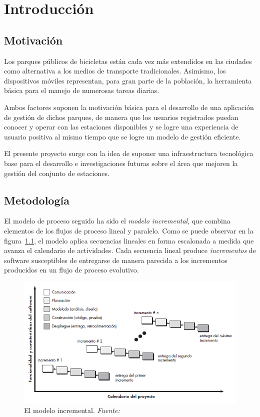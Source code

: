 \chapter{Introducción}

\section{Motivación}

Los parques públicos de bicicletas están cada vez más extendidos en las ciudades como alternativa a los medios de transporte tradicionales. Asimismo, los dispositivos móviles representan, para gran parte de la población, la herramienta básica para el manejo de numerosas tareas diarias.

Ambos factores suponen la motivación básica para el desarrollo de una aplicación de gestión de dichos parques, de manera que los usuarios registrados puedan conocer y operar con las estaciones disponibles y se logre una experiencia de usuario positiva al mismo tiempo que se logre un modelo de gestión eficiente.

El presente proyecto surge con la idea de suponer una infraestructura tecnológica base para el desarrollo e investigaciones futuras sobre el área que mejoren la gestión del conjunto de estaciones.

\section{Metodología}

El modelo de proceso seguido ha sido el \emph{modelo incremental}, que combina elementos de los flujos de proceso lineal y paralelo. Como se puede observar en la figura~\ref{fig:procesoIncremental}, el modelo aplica secuencias lineales en forma escalonada a medida que avanza el calendario de actividades. Cada secuencia lineal produce \emph{incrementos} de software susceptibles de entregarse de manera parecida a los incrementos producidos en un flujo de proceso evolutivo.

\begin{figure}
	\centering
	\includegraphics[width=\linewidth,height=\textheight,keepaspectratio]{Images/ModeloIncremental}
	\caption[El modelo incremental]{El modelo incremental. \textit{Fuente:~\cite{Pre10}}}
	\label{fig:procesoIncremental}
\end{figure}

